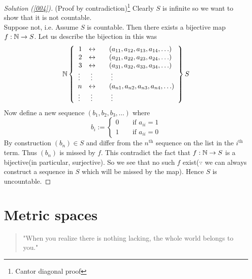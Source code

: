 \documentclass[	DIV=calc,paper=a4,fontsize=11pt]{scrartcl}	 	%
\theoremstyle{definition}
\theoremstyle{plain}
\theoremstyle{remark}
\begin{document}
\begin{proof}[Solution (\ref{004})](Proof by contradiction)\footnote{Cantor diagonal proof} Clearly $S$ is infinite so we want to show that it is not countable.\\
Suppose not, i.e. Assume $S$ is countable. Then there exists a bijective map $f:\Bbb N\to S$. Let us describe the bijection in this was
\[ \Bbb N \left\{\begin{array}{rllllll}
  1 & \leftrightarrow \quad &(a_{11},a_{12},a_{13},a_{14},\ldots)\\
  2 & \leftrightarrow \quad &(a_{21},a_{22},a_{23},a_{24},\ldots)\\
  3 & \leftrightarrow \quad &(a_{31},a_{32},a_{33},a_{34},\ldots)\\
  \vdots\; & \;\vdots&\; \vdots \\
  n & \leftrightarrow \quad &(a_{n1},a_{n2},a_{n3},a_{n4},\ldots)\\
  \vdots\; & \;\vdots&\; \vdots
  \end{array}\right\} S
\]
Now define a new sequence $(b_1,b_2,b_3,\ldots)$ where
\[b_i:=
\begin{cases}
0\qquad \text{if } a_{ii}=1\\
1\qquad \text{if } a_{ii}=0
\end{cases}
\]
By construction $(b_n)\in S$ and differ from the $n^{\text{th}}$ sequence on the list in the $i^{\text{th}}$ term. Thus $(b_n)$ is missed by $f$. This contradict the fact that $f:\Bbb N\to S$ is a bijective(in particular, surjective). So we see that no such $f$ exist($\because$ we can always construct a sequence in $S$ which will be missed by the map). Hence
$S$ is uncountable.
\end{proof}
\newpage
\section{Metric spaces}
\begin{quote}
"When you realize there is nothing lacking, the whole world belongs to you."
\end{quote}
\end{document}
